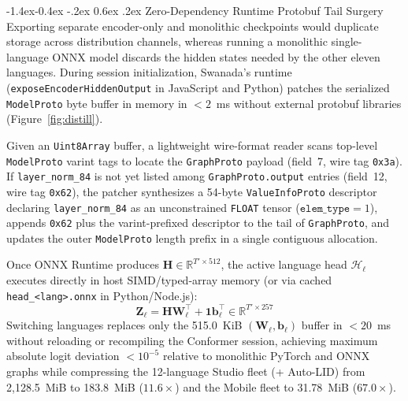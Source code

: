 \documentclass[10pt,twocolumn]{article}
\makeatletter
\renewcommand\subsection{\@startsection{subsection}{2}{\z@}%
  {-1.4ex\@plus -0.4ex \@minus -.2ex}%
  {0.6ex \@plus .2ex}%
  {\normalfont\normalsize\bfseries}}
\makeatother
\begin{document}
\subsection{Zero-Dependency Runtime Protobuf Tail Surgery}
Exporting separate encoder-only and monolithic checkpoints would duplicate storage across distribution channels, whereas running a monolithic single-language ONNX model discards the hidden states needed by the other eleven languages. During session initialization, Swanada's runtime (\texttt{exposeEncoderHiddenOutput} in JavaScript and Python) patches the serialized \texttt{ModelProto} byte buffer in memory in $< 2$~ms without external protobuf libraries (Figure~\ref{fig:distill}).

Given an \texttt{Uint8Array} buffer, a lightweight wire-format reader scans top-level \texttt{ModelProto} varint tags to locate the \texttt{GraphProto} payload (field~7, wire tag \texttt{0x3a}). If \texttt{layer\_norm\_84} is not yet listed among \texttt{GraphProto.output} entries (field~12, wire tag \texttt{0x62}), the patcher synthesizes a 54-byte \texttt{ValueInfoProto} descriptor declaring \texttt{layer\_norm\_84} as an unconstrained \texttt{FLOAT} tensor ($\texttt{elem\_type} = 1$), appends \texttt{0x62} plus the varint-prefixed descriptor to the tail of \texttt{GraphProto}, and updates the outer \texttt{ModelProto} length prefix in a single contiguous allocation.

Once ONNX Runtime produces $\mathbf{H} \in \mathbb{R}^{T' \times 512}$, the active language head $\mathcal{H}_\ell$ executes directly in host SIMD/typed-array memory (or via cached \texttt{head\_<lang>.onnx} in Python/Node.js):
\begin{equation}
\mathbf{Z}_\ell = \mathbf{H}\mathbf{W}_\ell^\top + \mathbf{1}\mathbf{b}_\ell^\top \in \mathbb{R}^{T' \times 257}
\label{eq:head}
\end{equation}
Switching languages replaces only the 515.0~KiB $(\mathbf{W}_\ell, \mathbf{b}_\ell)$ buffer in $< 20$~ms without reloading or recompiling the Conformer session, achieving maximum absolute logit deviation $< 10^{-5}$ relative to monolithic PyTorch and ONNX graphs while compressing the 12-language Studio fleet (+ Auto-LID) from 2,128.5~MiB to 183.8~MiB ($11.6\times$) and the Mobile fleet to 31.78~MiB ($67.0\times$).
\end{document}
